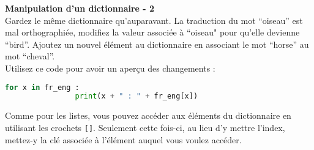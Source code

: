     \begin{Exercice}[5 minutes] \textbf{Manipulation d'un dictionnaire - 2}\\
       Gardez le même dictionnaire qu'auparavant. La traduction du mot ``oiseau'' est mal orthographiée, modifiez la valeur associée à ``oiseau" pour qu'elle devienne ``bird''. Ajoutez un nouvel élément au dictionnaire en associant le mot ``horse'' au mot ``cheval''. \\
       
       Utilisez ce code pour avoir un aperçu des changements : \\
       
       \begin{lstlisting}[language=Python]
            for x in fr_eng :
    			print(x + " : " + fr_eng[x])   \end{lstlisting}
    
        \begin{conseil}
            Comme pour les listes, vous pouvez accéder aux éléments du dictionnaire en utilisant les crochets \lstinline{[]}. Seulement cette fois-ci, au lieu d'y mettre l'index, mettez-y la clé associée à l'élément auquel vous voulez accéder.
        \end{conseil}
        
        \begin{solution}
             
        \end{solution}
    \end{Exercice}
    
